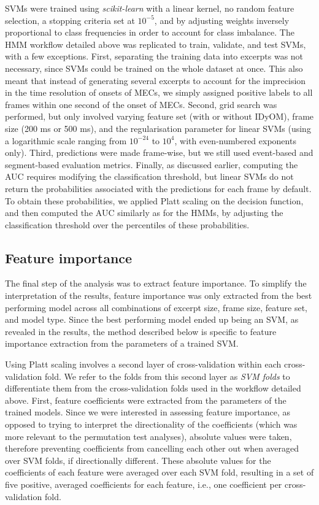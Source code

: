 SVMs were trained using \emph{scikit-learn} with a linear kernel, no random feature selection, a stopping criteria set at $10^{-5}$, and by adjusting weights inversely proportional to class frequencies in order to account for class imbalance. The HMM workflow detailed above was replicated to train, validate, and test SVMs, with a few exceptions. First, separating the training data into excerpts was not necessary, since SVMs could be trained on the whole dataset at once. This also meant that instead of generating several excerpts to account for the imprecision in the time resolution of onsets of MECs, we simply assigned positive labels to all frames within one second of the onset of MECs. Second, grid search was performed, but only involved varying feature set (with or without IDyOM), frame size (200 ms or 500 ms), and the regularisation parameter for linear SVMs (using a logarithmic scale ranging from $10^{-24}$ to $10^{4}$, with even-numbered exponents only). Third, predictions were made frame-wise, but we still used event-based and segment-based evaluation metrics. Finally, as discussed earlier, computing the AUC requires modifying the classification threshold, but linear SVMs do not return the probabilities associated with the predictions for each frame by default. To obtain these probabilities, we applied Platt scaling \parencite{platt1999} on the decision function, and then computed the AUC similarly as for the HMMs, by adjusting the classification threshold over the percentiles of these probabilities.

\subsection{Feature importance}

The final step of the analysis was to extract feature importance. To simplify the interpretation of the results, feature importance was only extracted from the best performing model across all combinations of excerpt size, frame size, feature set, and model type. Since the best performing model ended up being an SVM, as revealed in the results, the method described below is specific to feature importance extraction from the parameters of a trained SVM.

Using Platt scaling involves a second layer of cross-validation within each cross-validation fold. We refer to the folds from this second layer as \emph{SVM folds} to differentiate them from the cross-validation folds used in the workflow detailed above. First, feature coefficients were extracted from the parameters of the trained models. Since we were interested in assessing feature importance, as opposed to trying to interpret the directionality of the coefficients (which was more relevant to the permutation test analyses), absolute values were taken, therefore preventing coefficients from cancelling each other out when averaged over SVM folds, if directionally different. These absolute values for the coefficients of each feature were averaged over each SVM fold, resulting in a set of five positive, averaged coefficients for each feature, i.e., one coefficient per cross-validation fold.

